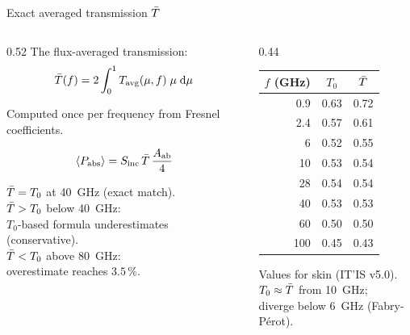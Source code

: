 \begin{frame}[label=app-p2-tbar]{Exact averaged transmission $\bar{T}$}

  \begin{columns}[T]
    \begin{column}{0.52\textwidth}
      The flux-averaged transmission:
      \[
        \bar{T}(f) = 2\int_0^1 T_{\mathrm{avg}}(\mu, f)\;\mu\;\mathrm{d}\mu
      \]

      Computed once per frequency from Fresnel coefficients.

      \vspace{2pt}
      \begin{resultbox}
        \vspace{-4pt}
        \[
          \langle P_{\mathrm{abs}} \rangle = S_{\mathrm{inc}}\,\bar{T}\,\frac{A_{\mathrm{ab}}}{4}
        \]
      \end{resultbox}

      \vspace{2pt}
      {\footnotesize
        $\bar{T} = T_0$ at \SI{40}{\giga\hertz} (exact match).\\
        $\bar{T} > T_0$ below \SI{40}{\giga\hertz}:\\
        $T_0$-based formula underestimates (conservative).\\
        $\bar{T} < T_0$ above \SI{80}{\giga\hertz}:\\
        overestimate reaches $3.5\,\%$.
      }
    \end{column}

    \begin{column}{0.44\textwidth}
      {\footnotesize
      \begin{tabular}{rcc}
        \toprule
        $f$ (GHz) & $T_0$ & $\bar{T}$ \\
        \midrule
        0.9  & 0.63 & 0.72 \\
        2.4  & 0.57 & 0.61 \\
        6    & 0.52 & 0.55 \\
        10   & 0.53 & 0.54 \\
        28   & 0.54 & 0.54 \\
        40   & 0.53 & 0.53 \\
        60   & 0.50 & 0.50 \\
        100  & 0.45 & 0.43 \\
        \bottomrule
      \end{tabular}
      }
      \vspace{-1pt}
      {\footnotesize Values for skin (IT'IS v5.0).\\
       $T_0 \approx \bar{T}$ from \SI{10}{\giga\hertz};\\
       diverge below \SI{6}{\giga\hertz} (Fabry-P\'erot).}
    \end{column}
  \end{columns}
  \vspace{-6pt}
  \quad{}
\end{frame}

